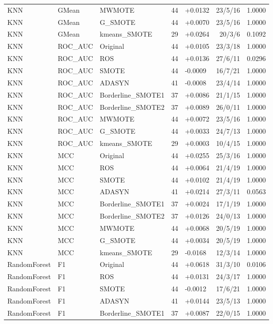 \documentclass[10pt,a4paper]{article}
\begin{document}
\begin{longtable}{lllllrr}
KNN & GMean & MWMOTE & 44 & +0.0132 & 23/5/16 & 1.0000 \\
KNN & GMean & G\_SMOTE & 44 & +0.0070 & 23/5/16 & 1.0000 \\
KNN & GMean & kmeans\_SMOTE & 29 & +0.0264 & 20/3/6 & 0.1092 \\
KNN & ROC\_AUC & Original & 44 & +0.0105 & 23/3/18 & 1.0000 \\
KNN & ROC\_AUC & ROS & 44 & +0.0136 & 27/6/11 & 0.0296 \\
KNN & ROC\_AUC & SMOTE & 44 & -0.0009 & 16/7/21 & 1.0000 \\
KNN & ROC\_AUC & ADASYN & 41 & -0.0008 & 23/4/14 & 1.0000 \\
KNN & ROC\_AUC & Borderline\_SMOTE1 & 37 & +0.0086 & 21/1/15 & 1.0000 \\
KNN & ROC\_AUC & Borderline\_SMOTE2 & 37 & +0.0089 & 26/0/11 & 1.0000 \\
KNN & ROC\_AUC & MWMOTE & 44 & +0.0072 & 23/5/16 & 1.0000 \\
KNN & ROC\_AUC & G\_SMOTE & 44 & +0.0033 & 24/7/13 & 1.0000 \\
KNN & ROC\_AUC & kmeans\_SMOTE & 29 & +0.0003 & 10/4/15 & 1.0000 \\
KNN & MCC & Original & 44 & +0.0255 & 25/3/16 & 1.0000 \\
KNN & MCC & ROS & 44 & +0.0064 & 21/4/19 & 1.0000 \\
KNN & MCC & SMOTE & 44 & +0.0102 & 21/4/19 & 1.0000 \\
KNN & MCC & ADASYN & 41 & +0.0214 & 27/3/11 & 0.0563 \\
KNN & MCC & Borderline\_SMOTE1 & 37 & +0.0024 & 17/1/19 & 1.0000 \\
KNN & MCC & Borderline\_SMOTE2 & 37 & +0.0126 & 24/0/13 & 1.0000 \\
KNN & MCC & MWMOTE & 44 & +0.0068 & 20/5/19 & 1.0000 \\
KNN & MCC & G\_SMOTE & 44 & +0.0034 & 20/5/19 & 1.0000 \\
KNN & MCC & kmeans\_SMOTE & 29 & -0.0168 & 12/3/14 & 1.0000 \\
RandomForest & F1 & Original & 44 & +0.0618 & 31/3/10 & 0.0106 \\
RandomForest & F1 & ROS & 44 & +0.0131 & 24/3/17 & 1.0000 \\
RandomForest & F1 & SMOTE & 44 & -0.0012 & 17/6/21 & 1.0000 \\
RandomForest & F1 & ADASYN & 41 & +0.0144 & 23/5/13 & 1.0000 \\
RandomForest & F1 & Borderline\_SMOTE1 & 37 & +0.0087 & 22/0/15 & 1.0000 \\

\end{longtable}
\end{document}
